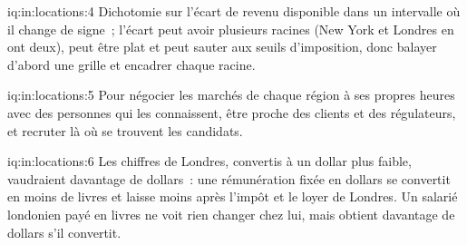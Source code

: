 \begin{solution}{iq:in:locations:4}
Dichotomie sur l'écart de revenu disponible dans un intervalle où il change de signe~; l'écart peut avoir plusieurs racines
(New York et Londres en ont deux), peut être plat et peut sauter aux seuils d'imposition, donc balayer d'abord une grille et encadrer chaque racine.
\end{solution}

\begin{solution}{iq:in:locations:5}
Pour négocier les marchés de chaque région à ses propres heures avec des personnes qui les connaissent, être proche des clients et des régulateurs, et recruter
là où se trouvent les candidats.
\end{solution}

\begin{solution}{iq:in:locations:6}
Les chiffres de Londres, convertis à un dollar plus faible, vaudraient davantage de dollars~: une rémunération fixée en dollars se convertit en
moins de livres et laisse moins après l'impôt et le loyer de Londres. Un salarié londonien payé en livres ne voit rien changer chez lui, mais
obtient davantage de dollars s'il convertit.
\end{solution}
